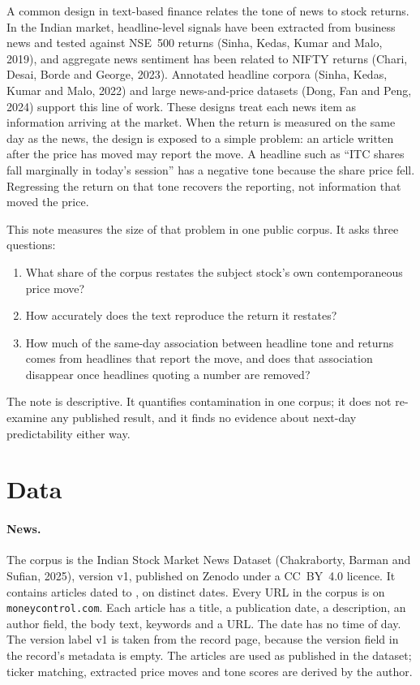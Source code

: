 \documentclass[11pt]{article}
\begin{document}
A common design in text-based finance relates the tone of news to stock returns. In the Indian market, headline-level signals have been extracted from business news and tested against NSE~500 returns (Sinha, Kedas, Kumar and Malo, 2019), and aggregate news sentiment has been related to NIFTY returns (Chari, Desai, Borde and George, 2023). Annotated headline corpora (Sinha, Kedas, Kumar and Malo, 2022) and large news-and-price datasets (Dong, Fan and Peng, 2024) support this line of work. These designs treat each news item as information arriving at the market. When the return is measured on the same day as the news, the design is exposed to a simple problem: an article written after the price has moved may report the move. A headline such as ``ITC shares fall marginally in today's session'' has a negative tone because the share price fell. Regressing the return on that tone recovers the reporting, not information that moved the price.

This note measures the size of that problem in one public corpus. It asks three questions:
\begin{enumerate}
  \item What share of the corpus restates the subject stock's own contemporaneous price move?
  \item How accurately does the text reproduce the return it restates?
  \item How much of the same-day association between headline tone and returns comes from headlines that report the move, and does that association disappear once headlines quoting a number are removed?
\end{enumerate}

The note is descriptive. It quantifies contamination in one corpus; it does not re-examine any published result, and it finds no evidence about next-day predictability either way.

\section{Data}

\paragraph{News.} The corpus is the Indian Stock Market News Dataset (Chakraborty, Barman and Sufian, 2025), version v1, published on Zenodo under a CC~BY~4.0 licence. It contains \nArticles{} articles dated \dateFirst{} to \dateLast{}, on \nDates{} distinct dates. Every URL in the corpus is on \texttt{moneycontrol.com}. Each article has a title, a publication date, a description, an author field, the body text, keywords and a URL. The date has no time of day. The version label v1 is taken from the record page, because the version field in the record's metadata is empty. The articles are used as published in the dataset; ticker matching, extracted price moves and tone scores are derived by the author.
\end{document}
